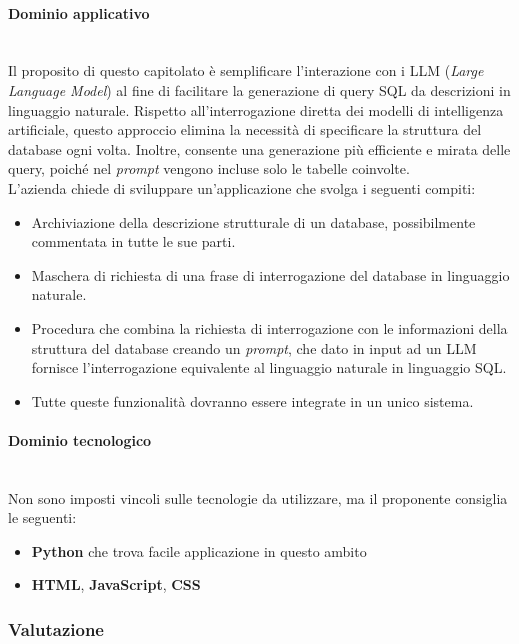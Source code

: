 \documentclass[italian,12pt]{article} %
\begin{document}
\paragraph{Dominio applicativo}\mbox{}\\
Il proposito di questo capitolato è semplificare l'interazione con i LLM (\textit{Large Language Model}) al fine di facilitare la generazione di query SQL da descrizioni in
linguaggio naturale. Rispetto all'interrogazione diretta dei modelli di intelligenza artificiale, questo approccio elimina la necessità di specificare la struttura
del database ogni volta. Inoltre, consente una generazione più efficiente e mirata delle query, poiché nel \textit{prompt} vengono incluse solo le tabelle coinvolte.
\\\linebreak\pagebreak\linebreak
L'azienda chiede di sviluppare un'applicazione che svolga i seguenti compiti:
\begin{itemize}
	\item Archiviazione della descrizione strutturale di un database, possibilmente commentata in tutte le sue parti.
	\item Maschera di richiesta di una frase di interrogazione del database in linguaggio naturale.
	\item Procedura che combina la richiesta di interrogazione con le informazioni della struttura del database creando un \textit{prompt}, che
	      dato in input ad un LLM fornisce l’interrogazione equivalente al linguaggio naturale in linguaggio SQL.
	\item Tutte queste funzionalità dovranno essere integrate in un unico sistema.
\end{itemize}
\paragraph{Dominio tecnologico}\mbox{}\\
Non sono imposti vincoli sulle tecnologie da utilizzare, ma il proponente consiglia le seguenti:
\begin{itemize}
	\item \textbf{Python} che trova facile applicazione in questo ambito
	\item \textbf{HTML}, \textbf{JavaScript}, \textbf{CSS}
\end{itemize}

\subsubsection{Valutazione}
\end{document}
